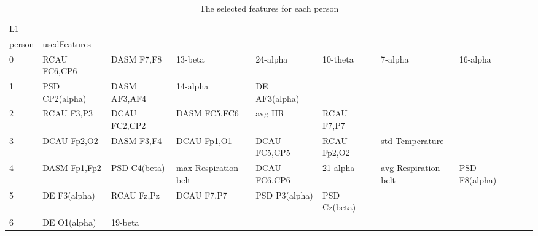 \begin{landscape}
\begin{table}[]
\centering
\caption{The selected features for each person}
\begin{tabular}{l|llllllll}
L1       &                       &                       &                      &                         &                         &                      &                      &                       &                       &                    \\
person   & usedFeatures          &                       &                      &                         &                         &                      &                      &                       &                       &                    \\
0        & RCAU FC6,CP6          & DASM F7,F8            & 13-beta              & 24-alpha                & 10-theta                & 7-alpha              & 16-alpha             &                       &                       &                    \\
1        & PSD CP2(alpha)        & DASM AF3,AF4          & 14-alpha             & DE AF3(alpha)           &                         &                      &                      &                       &                       &                    \\
2        & RCAU F3,P3            & DCAU FC2,CP2          & DASM FC5,FC6         & avg HR                  & RCAU F7,P7              &                      &                      &                       &                       &                    \\
3        & DCAU Fp2,O2           & DASM F3,F4            & DCAU Fp1,O1          & DCAU FC5,CP5            & RCAU Fp2,O2             & std Temperature      &                      &                       &                       &                    \\
4        & DASM Fp1,Fp2          & PSD C4(beta)          & max Respiration belt & DCAU FC6,CP6            & 21-alpha                & avg Respiration belt & PSD F8(alpha)        &                       &                       &                    \\
5        & DE F3(alpha)          & RCAU Fz,Pz            & DCAU F7,P7           & PSD P3(alpha)           & PSD Cz(beta)            &                      &                      &                       &                       &                    \\
6        & DE O1(alpha)          & 19-beta               &                      &                         &                         &                      &                      &                       &                       &                    \\

\end{tabular}
\end{table}
\end{landscape}

